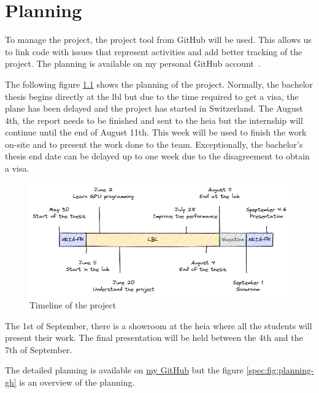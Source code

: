 \chapter{Planning}
\label{spec:ch:planning}

To manage the project, the project tool from GitHub will be used.
This allows us to link code with issues that represent activities and add better tracking of the project.
The planning is available on my personal GitHub account~\cite{github-project}.

The following figure \ref{spec:fig:timeline} shows the planning of the project.
Normally, the bachelor thesis begins directly at the \acrshort{lbl} but due to the time required to get a visa, the plane has been delayed and the project has started in Switzerland.
The August 4th, the report needs to be finished and sent to the \acrshort{heia} but the internship will continue until the end of August 11th.
This week will be used to finish the work on-site and to present the work done to the team.
Exceptionally, the bachelor's thesis end date can be delayed up to one week due to the disagreement to obtain a visa.

\begin{figure}[ht]
    \centering
    \includegraphics[width=\textwidth]{05-resources/img/spec/planning.excalidraw.png}
    \caption{Timeline of the project}
    \label{spec:fig:timeline}
\end{figure}


The 1st of September, there is a showroom at the \acrshort{heia} where all the students will present their work.
The final presentation will be held between the 4th and the 7th of September.

The detailed planning is available on \href{https://github.com/users/simbarras/projects/3/views/1}{my GitHub} but the figure \ref{spec:fig:planning-gh} is an overview of the planning.

